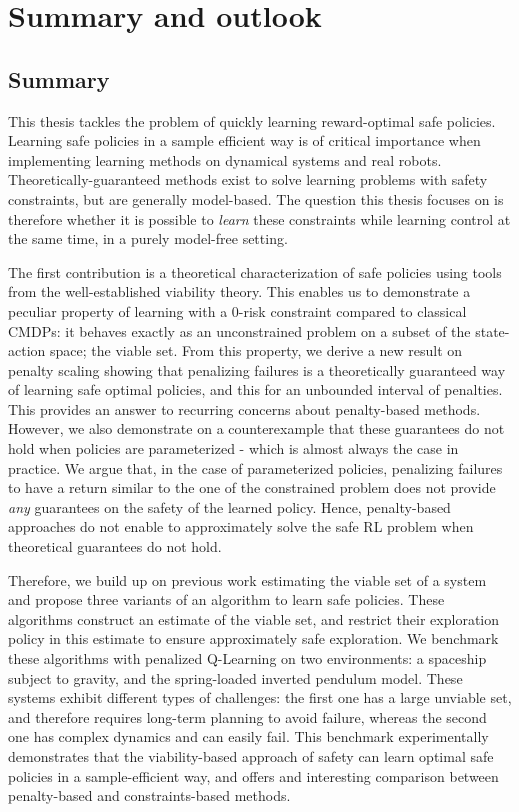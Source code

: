 \chapter{Summary and outlook}

\section{Summary} \label{sec:summary}
This thesis tackles the problem of quickly learning reward-optimal safe policies. Learning safe policies in a sample efficient way is of critical importance when implementing learning methods on dynamical systems and real robots. Theoretically-guaranteed methods exist to solve learning problems with safety constraints, but are generally model-based. The question this thesis focuses on is therefore whether it is possible to\emph{ learn} these constraints while learning control at the same time, in a purely model-free setting.\par
The first contribution is a theoretical characterization of safe policies using tools from the well-established viability theory. This enables us to demonstrate a peculiar property of learning with a $0$-risk constraint compared to classical CMDPs: it  behaves exactly as an unconstrained problem on a subset of the state-action space; the viable set. From this property, we derive a new result on penalty scaling showing that penalizing failures is a theoretically guaranteed way of learning safe optimal policies, and this for an unbounded interval of penalties. This provides an answer to recurring concerns about penalty-based methods. However, we also demonstrate on a counterexample that these guarantees do not hold when policies are parameterized - which is almost always the case in practice. We argue that, in the case of parameterized policies, penalizing failures to have a return similar to the one of the constrained problem does not provide\emph{ any} guarantees on the safety of the learned policy. Hence, penalty-based approaches do not enable to approximately solve the safe RL problem when theoretical guarantees do not hold.\par
Therefore, we build up on previous work estimating the viable set of a system and propose three variants of an algorithm to learn safe policies. These algorithms construct an estimate of the viable set, and restrict their exploration policy in this estimate to ensure approximately safe exploration. We benchmark these algorithms with penalized Q-Learning on two environments: a spaceship subject to gravity, and the spring-loaded inverted pendulum model. These systems exhibit different types of challenges: the first one has a large unviable set, and therefore requires long-term planning to avoid failure, whereas the second one has complex dynamics and can easily fail. This benchmark experimentally demonstrates that the viability-based approach of safety can learn optimal safe policies in a sample-efficient way, and offers and interesting comparison between penalty-based and constraints-based methods.

